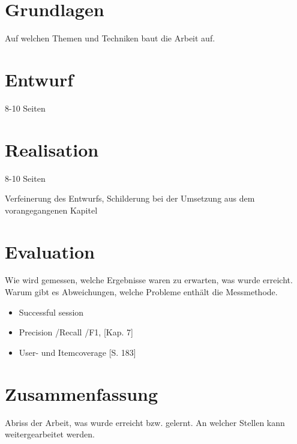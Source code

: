 \documentclass[a4paper, german, 12pt, onecolumn, oneside,bibliography=totoc,listof=totoc]{article}
\begin{document}
\pagestyle{empty}



\setcounter{page}{1}					%
\tableofcontents					%
\newpage

\renewcommand{\baselinestretch}{1.50}\normalsize
\setcounter{page}{1}					%


\section{Grundlagen}

	Auf welchen Themen und Techniken baut die Arbeit auf.

\section{Entwurf}

	8-10 Seiten

\section{Realisation}

	8-10 Seiten
	
	Verfeinerung des Entwurfs, Schilderung bei der Umsetzung aus dem vorangegangenen Kapitel

\section{Evaluation}

	Wie wird gemessen, welche Ergebnisse waren zu erwarten, was wurde erreicht. Warum gibt es Abweichungen, welche Probleme enthält die Messmethode.

	\begin{itemize}
	\item Successful session \citep{hb_18,Smyth05alive-user}
	\item Precision /Recall /F1, \citep{rs}[Kap. 7]
	\item User- und Itemcoverage \citep{rs}[S. 183]
	\end{itemize}

\section{Zusammenfassung}

	Abriss der Arbeit, was wurde erreicht bzw. gelernt. An welcher Stellen kann weitergearbeitet werden. 
\end{document}
